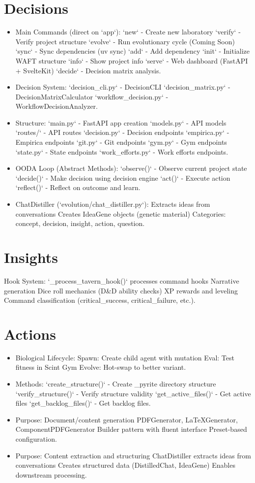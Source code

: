 \documentclass[11pt,letterpaper]{article}
\begin{document}
\section{Decisions}
\begin{itemize}
\item Main Commands (direct on `app`): `new` - Create new laboratory `verify` - Verify project structure `evolve` - Run evolutionary cycle (Coming Soon) `sync` - Sync dependencies (uv sync) `add` - Add dependency `init` - Initialize WAFT structure `info` - Show project info `serve` - Web dashboard (FastAPI + SvelteKit) `decide` - Decision matrix analysis.
\item Decision System: `decision\_cli.py` - DecisionCLI `decision\_matrix.py` - DecisionMatrixCalculator `workflow\_decision.py` - WorkflowDecisionAnalyzer.
\item Structure: `main.py` - FastAPI app creation `models.py` - API models `routes/` - API routes `decision.py` - Decision endpoints `empirica.py` - Empirica endpoints `git.py` - Git endpoints `gym.py` - Gym endpoints `state.py` - State endpoints `work\_efforts.py` - Work efforts endpoints.
\item OODA Loop (Abstract Methods): `observe()` - Observe current project state `decide()` - Make decision using decision engine `act()` - Execute action `reflect()` - Reflect on outcome and learn.
\item ChatDistiller (`evolution/chat\_distiller.py`): Extracts ideas from conversations Creates IdeaGene objects (genetic material) Categories: concept, decision, insight, action, question.
\end{itemize}

\section{Insights}
Hook System: `\_process\_tavern\_hook()` processes command hooks Narrative generation Dice roll mechanics (D\&D ability checks) XP rewards and leveling Command classification (critical\_success, critical\_failure, etc.).

\section{Actions}
\begin{itemize}
\item Biological Lifecycle: Spawn: Create child agent with mutation Eval: Test fitness in Scint Gym Evolve: Hot-swap to better variant.
\item Methods: `create\_structure()` - Create \_pyrite directory structure `verify\_structure()` - Verify structure validity `get\_active\_files()` - Get active files `get\_backlog\_files()` - Get backlog files.
\item Purpose: Document/content generation PDFGenerator, LaTeXGenerator, ComponentPDFGenerator Builder pattern with fluent interface Preset-based configuration.
\item Purpose: Content extraction and structuring ChatDistiller extracts ideas from conversations Creates structured data (DistilledChat, IdeaGene) Enables downstream processing.
\end{itemize}
\end{document}
